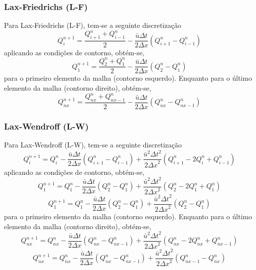 \subsubsection{Lax-Friedrichs (L-F)}
Para Lax-Friedrichs (L-F), tem-se a seguinte discretização
\begin{equation}\label{L-F}
    Q_i^{n+1} = \frac{Q_{i+1}^n + Q_{i-1}^n}{2}
    - \frac{\bar{u}\Delta t}{2\Delta x}\left(
    Q_{i+1}^n - Q_{i-1}^n
    \right)
\end{equation}
aplicando as condições de contorno, obtém-se,
\begin{equation}
    Q_1^{n+1} = \frac{Q_2^n + Q_1^n}{2}
    - \frac{\bar{u}\Delta t}{2\Delta x}\left(
        Q_2^n - Q_1^n
    \right)
\end{equation}
para o primeiro elemento da malha (contorno esquerdo). Enquanto para o último
elemento da malha (contorno direito), obtém-se,
\begin{equation}
    Q_{nx}^{n+1} = \frac{Q_{nx}^n + Q_{nx-1}^n}{2}
    - \frac{\bar{u}\Delta t}{2\Delta x}\left(
        Q_{nx}^n - Q_{nx-1}^n
    \right)
\end{equation}

\subsubsection{Lax-Wendroff (L-W)}
Para Lax-Wendroff (L-W), tem-se a seguinte discretização
\begin{equation}\label{L-W}
    Q_i^{n+1} = Q_i^n - \frac{\bar{u}\Delta t}{2\Delta x}\left(
        Q_{i+1}^n - Q_{i-1}^n
    \right) + \frac{\bar{u}^2{\Delta t}^2}{2{\Delta x}^2}\left(
        Q_{i+1}^n - 2Q_i^n + Q_{i-1}^n
    \right)
\end{equation}
aplicando as condições de contorno, obtém-se,
\[
    Q_1^{n+1} = Q_1^n - \frac{\bar{u}\Delta t}{2\Delta x}\left(
        Q_2^n - Q_1^n
    \right) + \frac{\bar{u}^2{\Delta t}^2}{2{\Delta x}^2}\left(
        Q_2^n - 2Q_1^n + Q_1^n
    \right)
\]
\begin{equation}\label{L-W esq}
    Q_1^{n+1} = Q_1^n - \frac{\bar{u}\Delta t}{2\Delta x}\left(
        Q_2^n - Q_1^n
    \right) + \frac{\bar{u}^2{\Delta t}^2}{2{\Delta x}^2}\left(
        Q_2^n - Q_1^n
    \right)
\end{equation}
para o primeiro elemento da malha (contorno esquerdo). Enquanto para o último
elemento da malha (contorno direito), obtém-se,
\[
    Q_{nx}^{n+1} = Q_{nx}^n - \frac{\bar{u}\Delta t}{2\Delta x}\left(
        Q_{nx}^n - Q_{nx-1}^n
    \right) + \frac{\bar{u}^2{\Delta t}^2}{2{\Delta x}^2}\left(
        Q_{nx}^n - 2Q_{nx}^n + Q_{nx-1}^n
    \right)
\]
\begin{equation}
    Q_{nx}^{n+1} = Q_{nx}^n - \frac{\bar{u}\Delta t}{2\Delta x}\left(
        Q_{nx}^n - Q_{nx-1}^n
    \right) + \frac{\bar{u}^2{\Delta t}^2}{2{\Delta x}^2}\left(
        Q_{nx-1}^n - Q_{nx}^n
    \right)
\end{equation}

